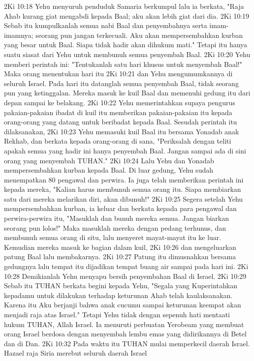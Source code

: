 2Ki 10:18  Yehu menyuruh penduduk Samaria berkumpul lalu ia berkata, "Raja Ahab kurang giat mengabdi kepada Baal; aku akan lebih giat dari dia.
2Ki 10:19  Sebab itu kumpulkanlah semua nabi Baal dan penyembahnya serta imam-imamnya; seorang pun jangan terkecuali. Aku akan mempersembahkan kurban yang besar untuk Baal. Siapa tidak hadir akan dihukum mati." Tetapi itu hanya suatu siasat dari Yehu untuk membunuh semua penyembah Baal.
2Ki 10:20  Yehu memberi perintah ini: "Tentukanlah satu hari khusus untuk menyembah Baal!" Maka orang menentukan hari itu
2Ki 10:21  dan Yehu mengumumkannya di seluruh Israel. Pada hari itu datanglah semua penyembah Baal, tidak seorang pun yang ketinggalan. Mereka masuk ke kuil Baal dan memenuhi gedung itu dari depan sampai ke belakang.
2Ki 10:22  Yehu memerintahkan supaya pengurus pakaian-pakaian ibadat di kuil itu memberikan pakaian-pakaian itu kepada orang-orang yang datang untuk beribadat kepada Baal. Sesudah perintah itu dilaksanakan,
2Ki 10:23  Yehu memasuki kuil Baal itu bersama Yonadab anak Rekhab, dan berkata kepada orang-orang di sana, "Periksalah dengan teliti apakah semua yang hadir ini hanya penyembah Baal. Jangan sampai ada di sini orang yang menyembah TUHAN."
2Ki 10:24  Lalu Yehu dan Yonadab mempersembahkan kurban kepada Baal. Di luar gedung, Yehu sudah menempatkan 80 pengawal dan perwira. Ia juga telah memberikan perintah ini kepada mereka, "Kalian harus membunuh semua orang itu. Siapa membiarkan satu dari mereka melarikan diri, akan dibunuh!"
2Ki 10:25  Segera setelah Yehu mempersembahkan kurban, ia keluar dan berkata kepada para pengawal dan perwira-perwira itu, "Masuklah dan bunuh mereka semua. Jangan biarkan seorang pun lolos!" Maka masuklah mereka dengan pedang terhunus, dan membunuh semua orang di situ, lalu menyeret mayat-mayat itu ke luar. Kemudian mereka masuk ke bagian dalam kuil,
2Ki 10:26  dan mengeluarkan patung Baal lalu membakarnya.
2Ki 10:27  Patung itu dimusnahkan bersama gedungnya lalu tempat itu dijadikan tempat buang air sampai pada hari ini.
2Ki 10:28  Demikianlah Yehu menyapu bersih penyembahan Baal di Israel.
2Ki 10:29  Sebab itu TUHAN berkata begini kepada Yehu, "Segala yang Kuperintahkan kepadamu untuk dilakukan terhadap keturunan Ahab telah kaulaksanakan. Karena itu Aku berjanji bahwa anak cucumu sampai keturunan keempat akan menjadi raja atas Israel." Tetapi Yehu tidak dengan sepenuh hati mentaati hukum TUHAN, Allah Israel. Ia menuruti perbuatan Yerobeam yang membuat orang Israel berdosa dengan menyembah lembu emas yang didirikannya di Betel dan di Dan.
2Ki 10:32  Pada waktu itu TUHAN mulai memperkecil daerah Israel. Hazael raja Siria merebut seluruh daerah Israel
